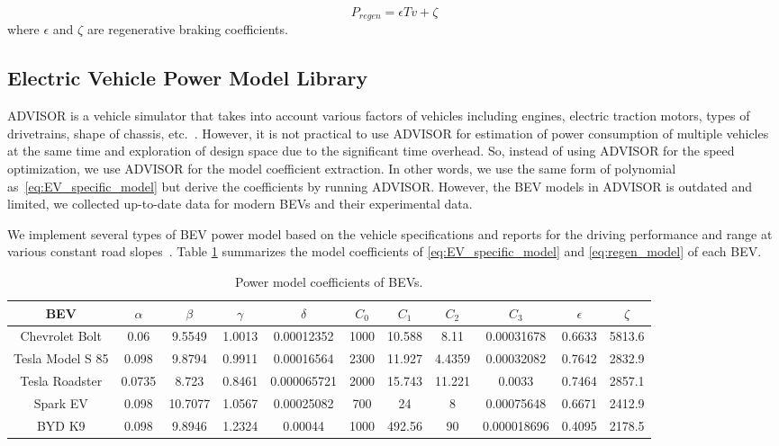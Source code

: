 \documentclass{IEEEtran}
\begin{document}
\begin{equation}\label{eq:regen_model} 
P_{regen} = \epsilon T v + \zeta
\end{equation}  %
where $\epsilon$ and $\zeta$ are regenerative braking coefficients.

\subsection{Electric Vehicle Power Model Library}

ADVISOR is a vehicle simulator that takes into account various factors of vehicles including engines, electric traction motors, types of drivetrains, shape of chassis, etc.~\cite{Markel:JPS02}. 
However, it is not practical to use ADVISOR for estimation of power consumption of multiple vehicles at the same time and exploration of design space due to the significant time overhead. 
So, instead of using ADVISOR for the speed optimization, we use ADVISOR for the model coefficient extraction. 
In other words, we use the same form of polynomial as~\eqref{eq:EV_specific_model} but derive the coefficients by running ADVISOR. However, the BEV models in ADVISOR is outdated and limited, we collected up-to-date data for modern BEVs and their experimental data.

We implement several types of BEV power model based on the vehicle specifications and reports for the driving performance and range at various constant road slopes~\cite{GM_Bolt:official,Tesla_ModelS:official,GM_Spark:official,BYD_K9:official,Tesla_Roadster:official}. 
Table \ref{table:Coeff_EVs} summarizes the model coefficients of \eqref{eq:EV_specific_model} and \eqref{eq:regen_model} of each BEV. 

\begin{table} 	%
\centering
\small
\caption{Power model coefficients of BEVs.}
\label{table:Coeff_EVs}
\begin{tabular}{|c|c|c|c|c|c|c|c|c|c|c|} \hline

BEV 		 	&$\alpha$	&$\beta$	&$\gamma$	&$\delta$		&$C_0$	&$C_1$	&$C_2$	&$C_3$		&$\epsilon$	&$\zeta$ \\ \hline

Chevrolet Bolt	&0.06	&9.5549	&1.0013		&0.00012352	&1000	&10.588	&8.11	&0.00031678	&0.6633		&5813.6 \\ \hline

Tesla Model S 85 &0.098	&9.8794	&0.9911		&0.00016564	&2300	&11.927	&4.4359	&0.00032082	& 0.7642		&2832.9 \\ \hline

Tesla Roadster	&0.0735	&8.723	&0.8461		&0.000065721	&2000	&15.743	&11.221	&0.0033		&0.7464		&2857.1 \\ \hline

Spark EV		&0.098	&10.7077	&1.0567		&0.00025082	&700		&24		&8	&0.00075648	&0.6671		&2412.9 \\ \hline

BYD K9		&0.098	&9.8946	&1.2324		&0.00044		&1000	&492.56	&90	&0.000018696	&0.4095		&2178.5 \\ \hline

\end{tabular}
\end{table}
\end{document}
